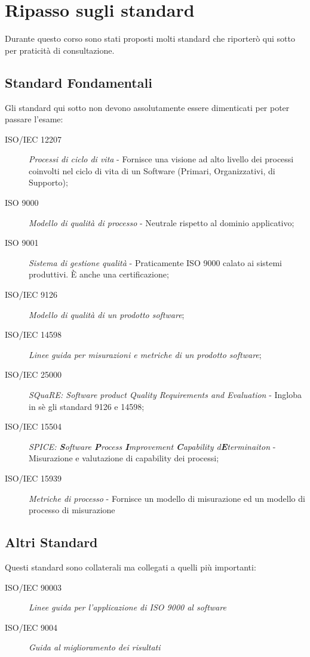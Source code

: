 
\pagebreak
{}
\section{Ripasso sugli standard}
Durante questo corso sono stati proposti molti standard che riporterò qui sotto per praticità di consultazione.\\
\subsection{Standard Fondamentali}
Gli standard qui sotto non devono assolutamente essere dimenticati per poter passare l'esame: \begin{description}
\item [ISO/IEC 12207] \textit{Processi di ciclo di vita} - Fornisce una visione ad alto livello dei processi coinvolti nel ciclo di vita di un Software (Primari, Organizzativi, di Supporto);
\item [ISO 9000] \textit{Modello di qualità di processo} - Neutrale rispetto al dominio applicativo;
\item [ISO 9001] \textit{Sistema di gestione qualità} - Praticamente ISO 9000 calato ai sistemi produttivi. È anche una certificazione;
\item [ISO/IEC 9126] \textit{Modello di qualità di un prodotto software};
\item [ISO/IEC 14598] \textit{Linee guida per misurazioni e metriche di un prodotto software};
\item [ISO/IEC 25000] \textit{SQuaRE: \textit{S}oftware product \textit{Qua}lity \textit{R}equirements and \textit{E}valuation} - Ingloba in sè gli standard 9126 e 14598;
\item [ISO/IEC 15504] \textit{SPICE: \textbf{S}oftware \textbf{P}rocess \textbf{I}mprovement \textbf{C}apability d\textbf{E}terminaiton} - Misurazione e valutazione di capability dei processi;
\item [ISO/IEC 15939] \textit{Metriche di processo} - Fornisce un modello di misurazione ed un modello di processo di misurazione
\end{description}

\subsection{Altri Standard}
Questi standard sono collaterali ma collegati a quelli più importanti: \begin{description}
\item [ISO/IEC 90003] \textit{Linee guida per l'applicazione di ISO 9000 al software}
\item [ISO/IEC 9004] \textit{Guida al miglioramento dei risultati}
\end{description}
